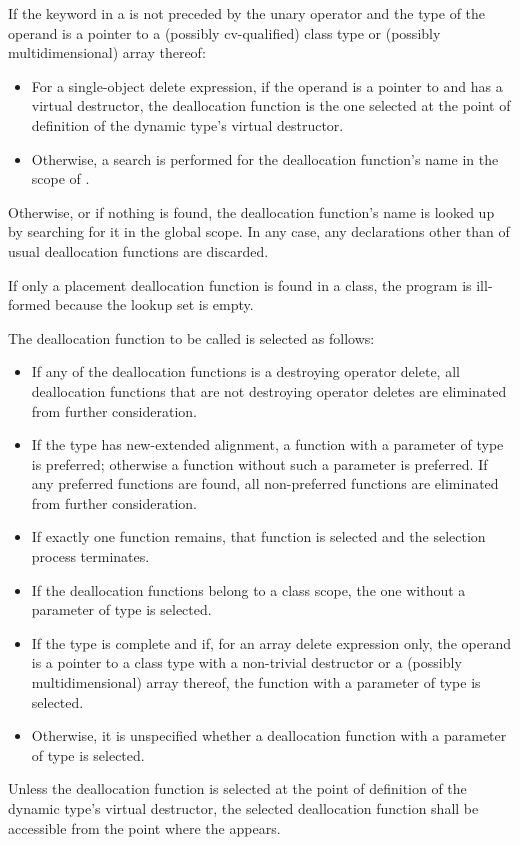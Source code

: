 \pnum
If the keyword  in a 
is not preceded by the unary \tcode{::} operator and the type of the operand is
a pointer to a (possibly cv-qualified) class type 
or (possibly multidimensional) array thereof:
\begin{itemize}
\item
For a single-object delete expression,
if the operand is a pointer to \cv{}  and
 has a virtual destructor,
the deallocation function is the one selected at the point of definition of
the dynamic type's virtual destructor.
\item
Otherwise,
a search is performed for the deallocation function's name
in the scope of .
\end{itemize}
Otherwise, or if nothing is found,
the deallocation function's name is looked up by
searching for it in the global scope.
In any case, any declarations
other than of usual deallocation functions
are discarded.
\begin{note}
If only a placement deallocation function is found in a class,
the program is ill-formed because the lookup set is empty.
\end{note}

\pnum
The deallocation function to be called is selected as follows:
\begin{itemize}
\item
If any of the deallocation functions is a destroying operator delete,
all deallocation functions that are not destroying operator deletes
are eliminated from further consideration.
\item
If the type has new-extended alignment,
a function with a parameter of type  is preferred;
otherwise a function without such a parameter is preferred.
If any preferred functions are found,
all non-preferred functions are eliminated from further consideration.
\item
If exactly one function remains,
that function is selected and the selection process terminates.
\item
If the deallocation functions belong to a class scope,
the one without a parameter of type  is selected.
\item
If the type is complete
and if, for an array delete expression only,
the operand is a pointer to a class type with a
non-trivial destructor or a (possibly multidimensional) array thereof,
the function with a parameter of type  is selected.
\item
Otherwise, it is unspecified
whether a deallocation function with a parameter of type 
is selected.
\end{itemize}
Unless the deallocation function is selected
at the point of definition of the dynamic type's virtual destructor,
the selected deallocation function shall be accessible
from the point where the  appears.


